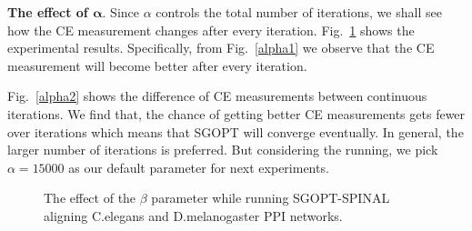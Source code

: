 \documentclass{bioinfo}
\theoremstyle{definition}
\begin{document}
\textbf{The effect of $\mathbf{\alpha}$}. Since $\alpha$ controls the total number of iterations, we shall see how the CE measurement changes after every iteration. Fig.~\ref{alpha} shows the experimental results. Specifically, from Fig.~\ref{alpha1} we observe that the CE measurement will become better after every iteration.

Fig.~\ref{alpha2} shows the difference of CE measurements between continuous iterations. We find that, the chance of getting better CE measurements gets fewer over iterations which means that SGOPT will converge eventually. In general, the larger number of iterations is preferred. But considering the running, we pick $\alpha=15000$ as our default parameter for next experiments.

\begin{figure}[!htbp]
    \caption{The effect of the $\beta$ parameter while running SGOPT-SPINAL aligning C.elegans and D.melanogaster PPI networks. }
    \label{alpha}
\end{figure}
\end{document}
